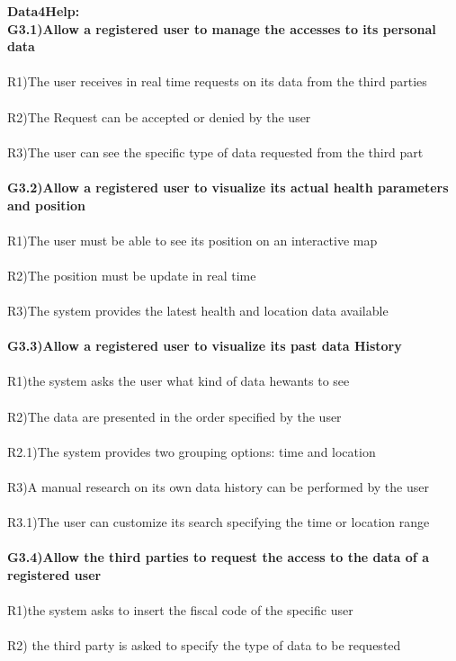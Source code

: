 \textbf{Data4Help:} \\
\textbf{G3.1)Allow a registered user to manage the accesses to its personal data} \\ \\
R1)The user receives in real time requests on its data from the third parties \\ \\
R2)The Request can be accepted or denied by the user\\ \\
R3)The user can see the specific type of data requested from the third part \\ \\ 
\textbf{ G3.2)Allow a registered user to visualize its actual health parameters and position} \\ \\
R1)The user must be able to see its position on an interactive map \\ \\
R2)The position must be update in real time \\ \\
R3)The system provides the latest health and location data available \\ \\
\textbf{G3.3)Allow a registered user to visualize its past data History} \\ \\
R1)the system asks the user what kind of data he\she wants to see \\ \\
R2)The data are presented in the order specified by the user  \\ \\
R2.1)The system provides two grouping options: time and location \\ \\
R3)A manual research on its own data history can be performed by the user \\ \\
R3.1)The user can customize its search specifying the time or location range \\ \\ 
\textbf{G3.4)Allow the third parties to request the access to the data of a registered user} \\ \\
R1)the system asks to insert the fiscal code of the specific user \\ \\
R2) the third party is asked to specify the type of data to be requested\\ \\ 
